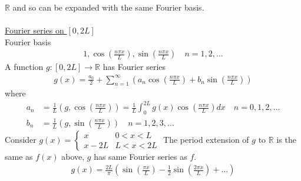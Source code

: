\documentclass[12pt, letterpaper]{article}
\begin{document}
$\mathbb{R}$ and so can be expanded with the same Fourier basis. \\ \\
\underline{Fourier series on $[0,2L]$} \\
Fourier basis 
\begin{align*}
    1,\cos\left(\frac{n\pi x}{L}\right),\sin\left(\frac{n\pi x}{L}\right)\quad n =1,2,\dots
\end{align*}
A function $g:[0,2L]\rightarrow \mathbb{R}$ has Fourier series 
\begin{align*}
    g(x) = \frac{a_0}{2} + \sum_{n=1}^{\infty}\left(a_n\cos\left(\frac{n\pi x}{L}\right)+b_n\sin\left(\frac{n\pi x}{L}\right)\right)
\end{align*}
where 
\begin{align*}
    a_n &= \frac 1L\left(g,\cos\left(\frac{n\pi x}{L}\right)\right) = \frac 1L \int_{0}^{2L} g(x)\cos\left(\frac{n\pi x}{L}\right)dx \quad n = 0,1,2,\dots \\
    b_n &= \frac 1L\left(g,\sin\left(\frac{n\pi x}{L}\right)\right) \quad n = 1,2,3,\dots
\end{align*}
 Consider $g(x) = \begin{cases}
    x & 0 < x < L \\
    x - 2L & L < x < 2L
\end{cases}$
The period extension of $g$ to $\mathbb{R}$ is the same as $f(x)$ above, $g$ has same Fourier series
as $f$.
\begin{align*}
    g(x) = \frac{2L}{\pi} \left(\sin\left(\frac{\pi x}{L}\right)-\frac 12\sin\left(\frac{2\pi x}{L}\right)+\dots\right)
\end{align*}
\end{document}
